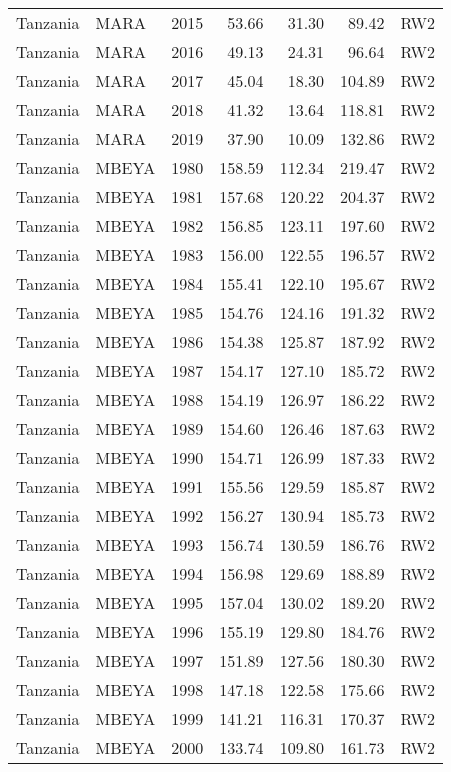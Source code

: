 \begin{longtable}{lllrrrl}
  Tanzania & MARA & 2015 & 53.66 & 31.30 & 89.42 & RW2 \\ 
  Tanzania & MARA & 2016 & 49.13 & 24.31 & 96.64 & RW2 \\ 
  Tanzania & MARA & 2017 & 45.04 & 18.30 & 104.89 & RW2 \\ 
  Tanzania & MARA & 2018 & 41.32 & 13.64 & 118.81 & RW2 \\ 
  Tanzania & MARA & 2019 & 37.90 & 10.09 & 132.86 & RW2 \\ 
  Tanzania & MBEYA & 1980 & 158.59 & 112.34 & 219.47 & RW2 \\ 
  Tanzania & MBEYA & 1981 & 157.68 & 120.22 & 204.37 & RW2 \\ 
  Tanzania & MBEYA & 1982 & 156.85 & 123.11 & 197.60 & RW2 \\ 
  Tanzania & MBEYA & 1983 & 156.00 & 122.55 & 196.57 & RW2 \\ 
  Tanzania & MBEYA & 1984 & 155.41 & 122.10 & 195.67 & RW2 \\ 
  Tanzania & MBEYA & 1985 & 154.76 & 124.16 & 191.32 & RW2 \\ 
  Tanzania & MBEYA & 1986 & 154.38 & 125.87 & 187.92 & RW2 \\ 
  Tanzania & MBEYA & 1987 & 154.17 & 127.10 & 185.72 & RW2 \\ 
  Tanzania & MBEYA & 1988 & 154.19 & 126.97 & 186.22 & RW2 \\ 
  Tanzania & MBEYA & 1989 & 154.60 & 126.46 & 187.63 & RW2 \\ 
  Tanzania & MBEYA & 1990 & 154.71 & 126.99 & 187.33 & RW2 \\ 
  Tanzania & MBEYA & 1991 & 155.56 & 129.59 & 185.87 & RW2 \\ 
  Tanzania & MBEYA & 1992 & 156.27 & 130.94 & 185.73 & RW2 \\ 
  Tanzania & MBEYA & 1993 & 156.74 & 130.59 & 186.76 & RW2 \\ 
  Tanzania & MBEYA & 1994 & 156.98 & 129.69 & 188.89 & RW2 \\ 
  Tanzania & MBEYA & 1995 & 157.04 & 130.02 & 189.20 & RW2 \\ 
  Tanzania & MBEYA & 1996 & 155.19 & 129.80 & 184.76 & RW2 \\ 
  Tanzania & MBEYA & 1997 & 151.89 & 127.56 & 180.30 & RW2 \\ 
  Tanzania & MBEYA & 1998 & 147.18 & 122.58 & 175.66 & RW2 \\ 
  Tanzania & MBEYA & 1999 & 141.21 & 116.31 & 170.37 & RW2 \\ 
  Tanzania & MBEYA & 2000 & 133.74 & 109.80 & 161.73 & RW2 \\ 

\end{longtable}
